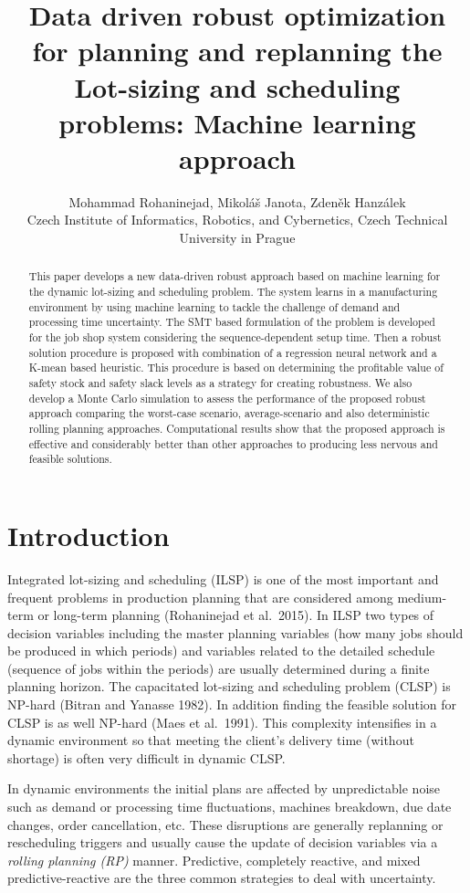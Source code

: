 \documentclass[letterpaper]{article} %
\title{Data driven robust optimization for planning and replanning the Lot-sizing and scheduling problems: Machine learning approach}
\author{Mohammad Rohaninejad, Mikoláš Janota, Zdeněk Hanzálek
\\
Czech Institute of Informatics, Robotics, and Cybernetics, Czech Technical University in Prague
}
\begin{document}
\maketitle

\begin{abstract}
This paper develops a new data-driven robust approach based on machine learning for the dynamic lot-sizing and scheduling problem. The system learns in a manufacturing environment by using machine learning to tackle the challenge of demand and processing time uncertainty. The SMT based formulation of the problem is developed for the job shop system considering the sequence-dependent setup time. Then a robust solution procedure is proposed with combination of a regression neural network and a K-mean based heuristic. This procedure is based on determining the profitable value of safety stock and safety slack levels as a strategy for creating robustness. We also develop a Monte Carlo simulation to assess the performance of the proposed robust approach comparing the worst-case scenario, average-scenario and also deterministic rolling planning approaches. Computational results show that the proposed approach is effective and considerably better than other approaches to producing less nervous and feasible solutions. 
\end{abstract}



\section{Introduction}

Integrated lot-sizing and scheduling (ILSP) is one of the most important and frequent problems in production planning that are considered among medium-term or long-term planning (Rohaninejad et al.\ 2015). In ILSP two types of decision variables including the master planning variables (how  many jobs should be produced in which periods) and variables related to the detailed schedule (sequence of jobs within the periods) are usually determined during a finite planning horizon. The capacitated lot-sizing and scheduling problem (CLSP) is NP-hard (Bitran and Yanasse 1982). In addition finding the feasible solution for CLSP is as well NP-hard (Maes et al.\ 1991). This complexity  intensifies in a dynamic environment so that meeting the client's delivery time (without shortage) is often very difficult in dynamic CLSP. 

In dynamic environments the initial plans are affected by unpredictable noise such as demand or processing time fluctuations, machines breakdown, due date changes, order cancellation, etc. These disruptions are generally replanning or rescheduling triggers and usually cause the update of decision variables via a \emph{rolling  planning (RP)} manner. Predictive, completely reactive, and mixed predictive-reactive are the three common strategies to deal with uncertainty.
\end{document}
